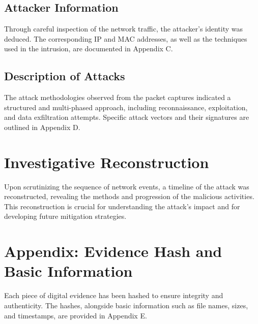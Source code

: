 \documentclass{article}
\begin{document}
    \subsection*{Attacker Information}
    Through careful inspection of the network traffic, the attacker's identity was deduced.
    The corresponding IP and MAC addresses, as well as the techniques used in the intrusion, are documented in Appendix C.

    \subsection*{Description of Attacks}
    The attack methodologies observed from the packet captures indicated a structured and multi-phased approach,
    including reconnaissance, exploitation, and data exfiltration attempts.
    Specific attack vectors and their signatures are outlined in Appendix D.


    \section*{\fontsize{14pt}{17pt}\selectfont Investigative Reconstruction}
    Upon scrutinizing the sequence of network events, a timeline of the attack was reconstructed,
    revealing the methods and progression of the malicious activities.
    This reconstruction is crucial for understanding the attack's impact and for developing future mitigation strategies.

    \section*{\fontsize{14pt}{17pt}\selectfont Appendix: Evidence Hash and Basic Information}
    Each piece of digital evidence has been hashed to ensure integrity and authenticity.
    The hashes, alongside basic information such as file names, sizes, and timestamps, are provided in Appendix E.
\end{document}
